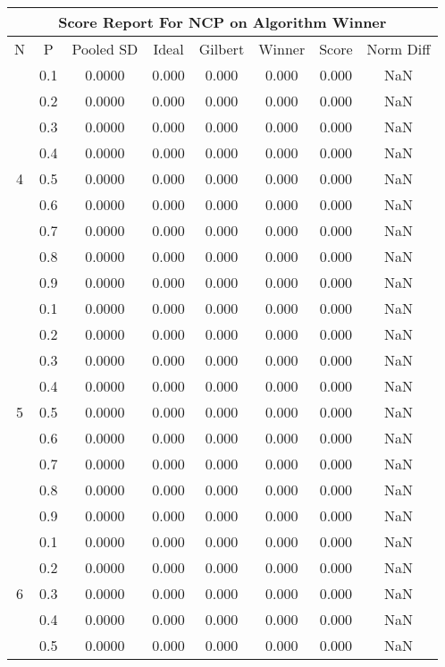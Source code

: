 \documentclass[11pt,a4paper]{report}
\begin{document}
\begin{longtable}{ | c | c || c | c | c | c | c | c | }
\hline
\multicolumn{8}{|c|}{ Score Report For NCP on Algorithm Winner} \\
\hline
N & P & Pooled SD &  Ideal &  Gilbert & Winner  & Score & Norm Diff \\
 \hline
 \hline
 \endhead
\multirow{9}{*}{4} & 0.1 & 0.0000 & 0.000 & 0.000 & 0.000 & 0.000 & NaN \\
 & 0.2 & 0.0000 & 0.000 & 0.000 & 0.000 & 0.000 & NaN \\
 & 0.3 & 0.0000 & 0.000 & 0.000 & 0.000 & 0.000 & NaN \\
 & 0.4 & 0.0000 & 0.000 & 0.000 & 0.000 & 0.000 & NaN \\
 & 0.5 & 0.0000 & 0.000 & 0.000 & 0.000 & 0.000 & NaN \\
 & 0.6 & 0.0000 & 0.000 & 0.000 & 0.000 & 0.000 & NaN \\
 & 0.7 & 0.0000 & 0.000 & 0.000 & 0.000 & 0.000 & NaN \\
 & 0.8 & 0.0000 & 0.000 & 0.000 & 0.000 & 0.000 & NaN \\
 & 0.9 & 0.0000 & 0.000 & 0.000 & 0.000 & 0.000 & NaN \\
 \hline
\multirow{9}{*}{5} & 0.1 & 0.0000 & 0.000 & 0.000 & 0.000 & 0.000 & NaN \\
 & 0.2 & 0.0000 & 0.000 & 0.000 & 0.000 & 0.000 & NaN \\
 & 0.3 & 0.0000 & 0.000 & 0.000 & 0.000 & 0.000 & NaN \\
 & 0.4 & 0.0000 & 0.000 & 0.000 & 0.000 & 0.000 & NaN \\
 & 0.5 & 0.0000 & 0.000 & 0.000 & 0.000 & 0.000 & NaN \\
 & 0.6 & 0.0000 & 0.000 & 0.000 & 0.000 & 0.000 & NaN \\
 & 0.7 & 0.0000 & 0.000 & 0.000 & 0.000 & 0.000 & NaN \\
 & 0.8 & 0.0000 & 0.000 & 0.000 & 0.000 & 0.000 & NaN \\
 & 0.9 & 0.0000 & 0.000 & 0.000 & 0.000 & 0.000 & NaN \\
 \hline
\multirow{9}{*}{6} & 0.1 & 0.0000 & 0.000 & 0.000 & 0.000 & 0.000 & NaN \\
 & 0.2 & 0.0000 & 0.000 & 0.000 & 0.000 & 0.000 & NaN \\
 & 0.3 & 0.0000 & 0.000 & 0.000 & 0.000 & 0.000 & NaN \\
 & 0.4 & 0.0000 & 0.000 & 0.000 & 0.000 & 0.000 & NaN \\
 & 0.5 & 0.0000 & 0.000 & 0.000 & 0.000 & 0.000 & NaN \\

\end{longtable}
\end{document}
